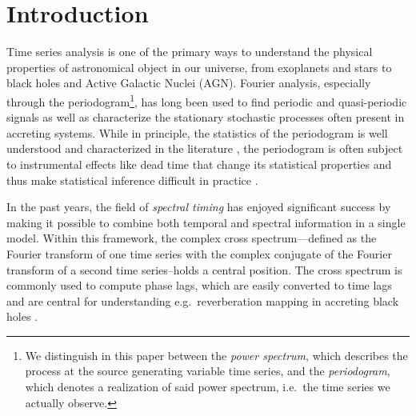 \documentclass[12pt]{emulateapj}
\begin{document}






\section{Introduction}

Time series analysis is one of the primary ways to understand the physical properties of astronomical object in our universe, from exoplanets and stars to black holes and Active Galactic Nuclei (AGN). 
Fourier analysis, especially through the periodogram\footnote{We distinguish in this paper between the \textit{power spectrum}, which describes the process at the source generating variable time series, and the \textit{periodogram}, which denotes a realization of said power spectrum, i.e.\ the time series we actually observe.}, has long been used to find periodic and quasi-periodic signals as well as characterize the stationary stochastic processes often present in accreting systems. 
While in principle, the statistics of the periodogram is well understood and characterized in the literature \citep[e.g.][]{vanderklis1989}, the periodogram is often subject to instrumental effects like dead time that change its statistical properties and thus make statistical inference difficult in practice \citep[e.g.][]{Zhang+95}.

In the past years, the field of \textit{spectral timing} has enjoyed significant success by making it possible to combine both temporal and spectral information in a single model. Within this framework, the complex cross spectrum---defined as the Fourier transform of one time series with the complex conjugate of the Fourier transform of a second time series--holds a central position. The cross spectrum is commonly used to compute phase lags, which are easily converted to time lags and are central for understanding e.g.\ reverberation mapping in accreting black holes \citep[see][for a recent review]{uttley2014}. 
\end{document}
